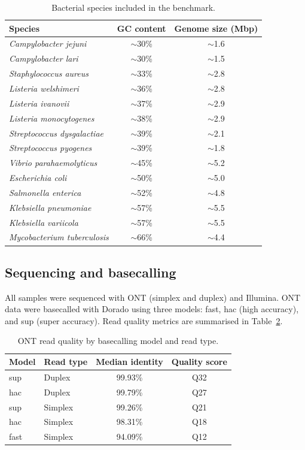 \documentclass[11pt]{article}
\begin{document}
\begin{table}[htbp]
\centering
\caption{Bacterial species included in the benchmark.}
\label{tab:species}
\begin{tabular}{@{}lcc@{}}
\toprule
Species & GC content & Genome size (Mbp) \\
\midrule
\textit{Campylobacter jejuni}         & $\sim$30\% & $\sim$1.6 \\
\textit{Campylobacter lari}           & $\sim$30\% & $\sim$1.5 \\
\textit{Staphylococcus aureus}        & $\sim$33\% & $\sim$2.8 \\
\textit{Listeria welshimeri}          & $\sim$36\% & $\sim$2.8 \\
\textit{Listeria ivanovii}            & $\sim$37\% & $\sim$2.9 \\
\textit{Listeria monocytogenes}       & $\sim$38\% & $\sim$2.9 \\
\textit{Streptococcus dysgalactiae}   & $\sim$39\% & $\sim$2.1 \\
\textit{Streptococcus pyogenes}       & $\sim$39\% & $\sim$1.8 \\
\textit{Vibrio parahaemolyticus}      & $\sim$45\% & $\sim$5.2 \\
\textit{Escherichia coli}             & $\sim$50\% & $\sim$5.0 \\
\textit{Salmonella enterica}          & $\sim$52\% & $\sim$4.8 \\
\textit{Klebsiella pneumoniae}        & $\sim$57\% & $\sim$5.5 \\
\textit{Klebsiella variicola}         & $\sim$57\% & $\sim$5.5 \\
\textit{Mycobacterium tuberculosis}   & $\sim$66\% & $\sim$4.4 \\
\bottomrule
\end{tabular}
\end{table}

\subsection{Sequencing and basecalling}
All samples were sequenced with ONT (simplex and duplex) and Illumina. ONT data were basecalled with Dorado using three models: fast, hac (high accuracy), and sup (super accuracy). Read quality metrics are summarised in Table~\ref{tab:readqual}.

\begin{table}[htbp]
\centering
\caption{ONT read quality by basecalling model and read type.}
\label{tab:readqual}
\begin{tabular}{@{}llcc@{}}
\toprule
Model & Read type & Median identity & Quality score \\
\midrule
sup  & Duplex  & 99.93\% & Q32 \\
hac  & Duplex  & 99.79\% & Q27 \\
sup  & Simplex & 99.26\% & Q21 \\
hac  & Simplex & 98.31\% & Q18 \\
fast & Simplex & 94.09\% & Q12 \\
\bottomrule
\end{tabular}
\end{table}
\end{document}
